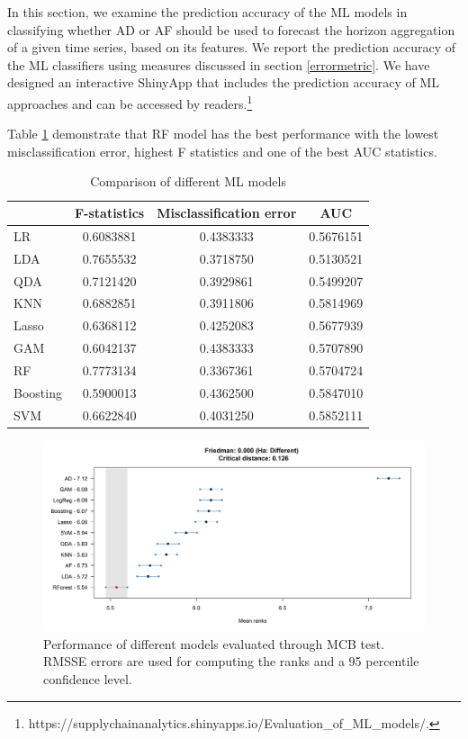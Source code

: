 \documentclass[]{elsarticle} %
\begin{document}
In this section, we examine the prediction accuracy of the ML models in
classifying whether AD or AF should be used to forecast the horizon
aggregation of a given time series, based on its features. We report the
prediction accuracy of the ML classifiers using measures discussed in
section \ref{errormetric}. We have designed an interactive ShinyApp that
includes the prediction accuracy of ML approaches and can be accessed by
readers.\footnote{https://supplychainanalytics.shinyapps.io/Evaluation\_of\_ML\_models/.}

Table \ref{tab:cost} demonstrate that RF model has the best performance
with the lowest misclassification error, highest F statistics and one of
the best AUC statistics.

\begin{table}
\caption{\label{tab:cost}Comparison of different ML models}
\centering
\begin{tabular}[t]{lccc}
\hline
 & F-statistics & Misclassification error & AUC\\
\hline
LR &  0.6083881 &  0.4383333 & 0.5676151\\
\hline
LDA & 0.7655532 & 0.3718750 & 0.5130521\\
\hline
QDA &  0.7121420 & 0.3929861 & 0.5499207\\
\hline
KNN &  0.6882851 & 0.3911806 & 0.5814969\\
\hline
Lasso & 0.6368112 & 0.4252083 & 0.5677939\\
\hline
GAM &  0.6042137 & 0.4383333 & 0.5707890\\
\hline
RF & 0.7773134 & 0.3367361 & 0.5704724\\
\hline
Boosting & 0.5900013 & 0.4362500 & 0.5847010\\
\hline
SVM & 0.6622840 & 0.4031250 & 0.5852111\\
\hline
\end{tabular}
\end{table}

\begin{figure}[H]

{\centering \includegraphics[width=1\linewidth]{img/300dpi/Fig_MCB_all} 

}

\caption{Performance of different models evaluated through MCB test. RMSSE errors are used for computing the ranks and a 95 percentile confidence level.}\label{fig:MCB_ML}
\end{figure}
\end{document}

